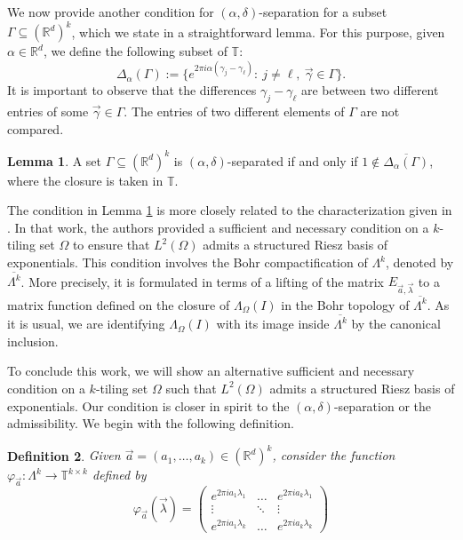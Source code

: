 \documentclass[a4paper,11pt]{amsart}
\newtheorem{fed}{Definition}[section]
\theoremstyle{definition}
\newtheorem{lem}[fed]{Lemma}
\theoremstyle{definition}
\def\fii{\varphi }
\def\la{\lambda}
\def\La{\Lambda}
\def\W{\Omega}
\def\R{\mathbb{R}}
\def\T{\mathbb{T}}
\begin{document}
We now provide another condition for $( \alpha,\delta)$-separation for a subset $\Gamma\subseteq (\R^d)^k$, which we state in a straightforward lemma. For this purpose, given $ \alpha\in\R^d$, we define the following subset of $\T$:
\begin{equation}\label{eq diferencias}
	\Delta_{\alpha}(\Gamma):=\{e^{2\pi i  \alpha (\gamma_j-\gamma_\ell)}:\ j\neq \ell,\ \vec\gamma\in\Gamma\}. 
\end{equation}
It is important to observe that the differences $\gamma_j-\gamma_\ell$ are between two different entries of some $\vec\gamma\in\Gamma$. The entries of two different elements of $\Gamma$ are not compared.

\begin{lem}\label{lem:separated}
	A set  $\Gamma\subseteq (\R^d)^k$ is $(\alpha,\delta)$-separated if and only if $1\notin \overline{\Delta_{ \alpha}(\Gamma)}$, where the closure is taken in $\T$. 
\end{lem}

The condition in Lemma \ref{lem:separated} is more closely related to the characterization given in \cite{CUC}. In that work, the authors provided a sufficient and necessary condition on a $k$-tiling set $\W$ to ensure that $L^2(\W)$ admits a structured Riesz basis of exponentials. This condition involves the Bohr compactification of $\La^k$, denoted by $\overline{\La^k}$. More precisely, it is formulated in terms of a lifting of the matrix $E_{\vec{a},\vec{\la}}$ to a matrix function defined on the closure of $\La_\W(I)$ in the Bohr topology of $\overline{\La^k}$. As it is usual, we are identifying $\La_\W(I)$ with its image inside $\overline{\La^k}$ by the canonical inclusion. 

To conclude this work, we will show an alternative sufficient and necessary condition on a $k$-tiling set $\W$ such that $L^2(\W)$ admits a structured Riesz basis of exponentials. Our condition is closer in spirit to the $(\alpha,\delta)$-separation or the admissibility. We begin with the following definition.


\begin{fed}
	Given $\vec{a}=(a_1,\dots,a_k)\in(\R^d)^k$, consider the function $\fii_{\vec{a}}:\La^k\to\T^{k\times k}$ defined by
	$$
	\fii_{\vec{a}}(\vec{\la})=
	\begin{pmatrix}
		e^{2\pi i a_1 \la_1} &\ldots& e^{2\pi i a_k  \la_1}  \\
		\vdots&\ddots&\vdots\\
		e^{2\pi i a_1 \la_k}&\ldots& e^{2\pi i a_k  \la_k}
	\end{pmatrix}		
	$$
\end{fed}	
\end{document}

